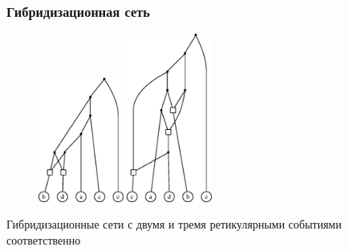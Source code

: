 \documentclass[hyperref={unicode}]{beamer}
\begin{document}







\begin{frame}
\frametitle{Гибридизационная сеть}

\centering

\begin{figure}[t]
	\includegraphics[width=2.8cm]{img/ans.eps}
	\hspace{1cm}
	\includegraphics[width=2.8cm]{img/ans3.eps}
\end{figure}

Гибридизационные сети с двумя и тремя ретикулярными событиями соответственно

\end{frame} 
\end{document}

